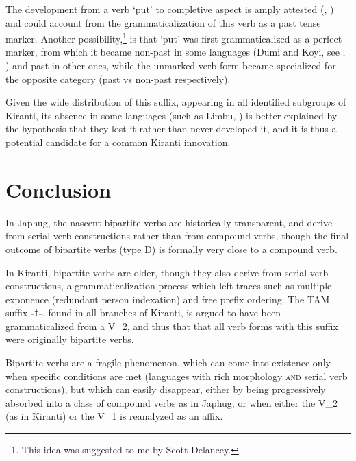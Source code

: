 \documentclass[oneside,a4paper,11pt]{article}
\newcommand{\ipa}[1]{{\phon\textbf{#1}}}
\begin{document}
The development from a verb `put' to completive aspect is amply attested (\citealt[58]{bybee94TAM}, \citealt[248]{heine-kuteva02}) and could account from the grammaticalization of this verb as a past tense marker. Another possibility,\footnote{This idea was suggested to me by Scott Delancey.} is that `put' was first grammaticalized as a perfect marker, from which it became non-past in some languages (Dumi and Koyi, see \citealt{driem93dumi}, \citealt{lahaussois09}) and past in other ones, while the unmarked verb form became specialized for the opposite category (past vs non-past respectively).

Given the wide distribution of this suffix, appearing in all identified subgroups of Kiranti, its absence in some languages (such as Limbu, \citealt{driem87}) is better explained by the hypothesis that they lost it rather than never developed it, and it is thus a potential candidate for a common Kiranti innovation.

\section*{Conclusion}
In Japhug, the nascent bipartite verbs are historically transparent, and derive from serial verb constructions rather than from compound verbs, though the final outcome of bipartite verbs (type D) is formally very close to a compound verb.

In Kiranti, bipartite verbs are older, though they also derive from serial verb constructions, a grammaticalization process which left traces such as multiple exponence (redundant person indexation) and free prefix ordering. The TAM suffix \ipa{-t-}, found in all branches of Kiranti, is argued to have been grammaticalized from a V_2, and thus that that all verb forms with this suffix were originally bipartite verbs. 

Bipartite verbs are a fragile phenomenon, which can come into existence only when specific conditions are met (languages with rich morphology \textsc{and} serial verb constructions), but which can easily disappear, either by being progressively absorbed into a class of compound verbs as in Japhug, or when either the V_2 (as in Kiranti) or the V_1 is reanalyzed as an affix.





 
\end{document}
